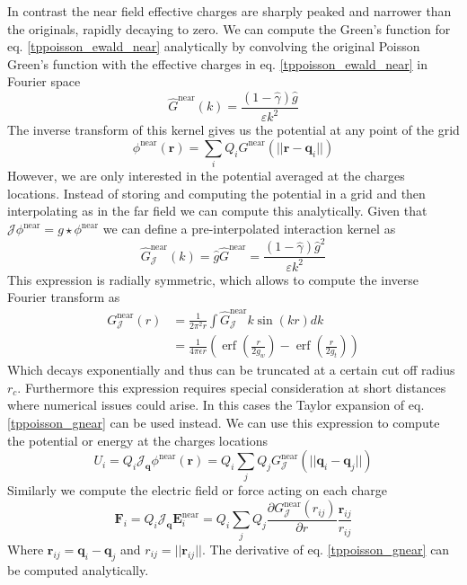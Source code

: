 \documentclass[ twoside,openright,titlepage,numbers=noenddot,%
headinclude,footinclude,cleardoublepage=empty,abstract=on,
BCOR=5mm,paper=a4,fontsize=11pt, dvipsnames
]{scrreprt}
\renewcommand{\vec}[1]{\bm{#1}}
\newcommand{\oper}[1]{\mathcal{#1}}
\newcommand{\near}{\textrm{near}}
\DeclareMathOperator{\erf}{erf}
\newcommand{\ppos}{q}
\newcommand{\fpos}{r}
\begin{document}
In contrast the near field effective charges are sharply peaked and narrower than the originals, rapidly decaying to zero. We can compute the Green's function for eq. \eqref{tppoisson_ewald_near} analytically by convolving the original Poisson Green's function with the effective charges in eq. \eqref{tppoisson_ewald_near} in Fourier space
\begin{equation}
  \hat{G}^{\near}(k) = \frac{(1-\hat{\gamma})\hat{g}}{\varepsilon k^2}
\end{equation}
The inverse transform of this kernel gives us the potential at any point of the grid 
\begin{equation}
  \phi^{\near}(\vec{\fpos}) = \sum_i{Q_iG^{\near}(||\vec{\fpos}-\vec{\ppos}_i||)}
\end{equation}
However, we are only interested in the potential averaged at the charges locations. Instead of storing and computing the potential in a grid and then interpolating as in the far field we can compute this analytically. Given that $\oper{J} \phi^{\near} = g\star \phi^{\near}$ we can define a pre-interpolated interaction kernel as
\begin{equation}
  \hat{G}_{\oper{J}}^{\near}(k) = \hat{g}\hat{G}^{\near} = \frac{(1-\hat{\gamma})\hat{g}^2}{\varepsilon k^2}
\end{equation}
This expression is radially symmetric, which allows to compute the inverse Fourier transform as
\begin{equation}
  \label{tppoisson_gnear}
  \begin{aligned}
    G_{\oper{J}}^{\near}(r) &= \frac{1}{2\pi^2r}\int{\hat{G}^{\near}_{\oper{J}}k \sin(kr)dk} \\
            &= \frac{1}{4\pi\epsilon r}\left(\erf\left(\frac{r}{2g_w}\right) - \erf\left(\frac{r}{2g_t}\right)\right)
  \end{aligned}
\end{equation}
Which decays exponentially and thus can be truncated at a certain cut off radius $r_c$. Furthermore this expression requires special consideration at short distances where numerical issues could arise. In this cases the Taylor expansion of eq. \eqref{tppoisson_gnear} can be used instead.
We can use this expression to compute the potential or energy at the charges locations
\begin{equation}
  U_i = Q_i\oper{J}_{\vec{\ppos}}\phi^{\near}(\vec{\fpos}) = Q_i\sum_j{Q_jG_{\oper{J}}^{\near}(||\vec{\ppos}_i - \vec{\ppos}_j||)}
\end{equation}
Similarly we compute the electric field or force acting on each charge 
\begin{equation}
  \vec{F}_i = Q_i \oper{J}_{\vec{\ppos}} \vec{E}^{\near}_i = Q_i\sum_j{Q_j\frac{\partial G_{\oper{J}}^{\near}({r_{ij}})}{\partial r}\frac{\vec{r}_{ij}}{r_{ij}}}
\end{equation}
Where $\vec{r}_{ij} = \vec{\ppos}_i - \vec{\ppos}_j$ and $r_{ij} = ||\vec{r}_{ij}||$. The derivative of eq. \eqref{tppoisson_gnear} can be computed analytically.
\end{document}
